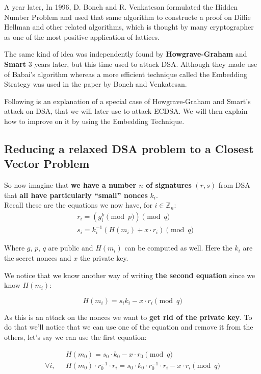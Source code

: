 \documentclass[a4paper,11pt]{article}
\begin{document}
A year later, In 1996, D. Boneh and R. Venkatesan\cite{boneh-venkatesan} formulated the Hidden Number Problem and used that same algorithm to constructe a proof on Diffie Hellman and other related algorithms, which is thought by many cryptographer as one of the most positive application of lattices.

The same kind of idea was independently found by \textbf{Howgrave-Graham} and \textbf{Smart} 3 years later\cite{HG-smart}, but this time used to attack DSA. Although they made use of Babai's algorithm whereas a more efficient technique called the Embedding Strategy was used in the paper by Boneh and Venkatesan.

Following is an explanation of a special case of Howgrave-Graham and Smart's attack on DSA, that we will later use to attack ECDSA. We will then explain how to improve on it by using the Embedding Technique.

\subsection{Reducing a relaxed DSA problem to a Closest Vector Problem}

So now imagine that \textbf{we have a number $n$ of signatures} $(r,s)$ from DSA that \textbf{all have particularly ``small'' nonces} $k_i$.\\
Recall these are the equations we now have, for $i \in \mathbb{Z}_n$:
\begin{align*}
&r_i = (g^k_i \pmod{p}) \pmod{q}\\
&s_i = k_i^{-1} ( H(m_i) + x \cdot r_i ) \pmod{q}
\end{align*}

Where $g$, $p$, $q$ are public and $H(m_i)$ can be computed as well. Here the $k_i$ are the secret nonces and $x$ the private key.

We notice that we know another way of writing \textbf{the second equation} since we know $H(m_i)$:

$$ H(m_i) = s_i k_i - x \cdot r_i \pmod{q} $$

As this is an attack on the nonces we want to \textbf{get rid of the private key}. To do that we'll notice that we can use one of the equation and remove it from the others, let's say we can use the first equation:

\begin{align*}
&H(m_0) = s_0 \cdot k_0 - x \cdot r_0 \pmod{q}\\
\forall i, \text{ } &H(m_0) \cdot r_0^{-1} \cdot r_i = s_0 \cdot k_0 \cdot r_0^{-1} \cdot r_i - x \cdot r_i \pmod{q}
\end{align*}
\end{document}
